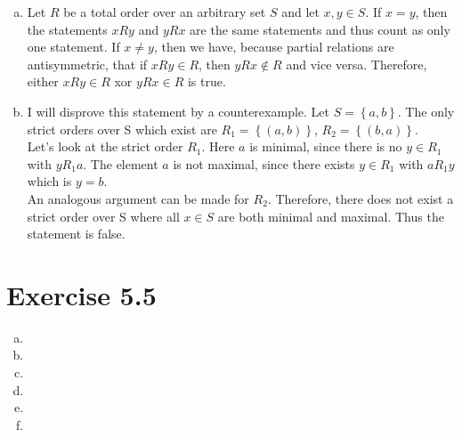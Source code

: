 \documentclass{article} %
\newcommand{\homeworkNumber}{5}
\begin{document}
\begin{enumerate}[(a)]
	\item Let \( R \) be a total order over an arbitrary set \( S \) and let \( x,y \in S \).
	      If \( x = y \), then the statements \( xRy  \) and \( yRx \) are the same statements and thus count as only one statement.
	      If \( x \neq y \), then we have, because partial relations are antisymmetric, that if \( xRy \in R\), then \( yRx \not\in R\) and vice versa.
	      Therefore, either \( xRy \in R \) xor \( yRx \in R \) is true.
	\item I will disprove this statement by a counterexample.
	      Let \( S = \left\{ a,b \right\}  \).
	      The only strict orders over S which exist are \( R_{1} = \left\{ (a,b) \right\}  \), \( R_{2} = \left\{ (b, a) \right\}  \). \\
	      Let's look at the strict order \( R_{1} \).
	      Here \( a \) is minimal, since there is no \( y \in R_{1} \) with \( yR_{1}a \).
	      The element \( a \) is not maximal, since there exists \( y \in R_{1} \) with \( aR_{1}y \) which is \( y = b \). \\
	      An analogous argument can be made for \( R_{2} \).
	      Therefore, there does not exist a strict order over S where all \( x \in S \) are both minimal and maximal. Thus the statement is false.

\end{enumerate}


\section*{Exercise \homeworkNumber.5}

\begin{enumerate}[(a)]
	\item
	\item
	\item
	\item
	\item
	\item
\end{enumerate}
\end{document}
